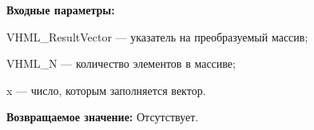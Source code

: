 \textbf{Входные параметры:}

 VHML\_ResultVector --- указатель на преобразуемый массив;
 
 VHML\_N --- количество элементов в массиве;
 
 x --- число, которым заполняется вектор.

\textbf{Возвращаемое значение:}
Отсутствует.